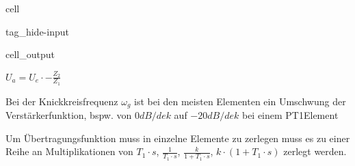 \documentclass[letterpaper,10pt,english]{jupyterBook}
\begin{document}
\begin{sphinxuseclass}{cell}
\begin{sphinxuseclass}{tag_hide-input}\begin{sphinxVerbatimOutput}

\begin{sphinxuseclass}{cell_output}
\noindent{}

\end{sphinxuseclass}\end{sphinxVerbatimOutput}

\end{sphinxuseclass}
\end{sphinxuseclass}
\sphinxAtStartPar
\(U_a = U_e\cdot -\frac{Z_2}{Z_1}\)

\begin{DUlineblock}{0em}
\item[] 
\end{DUlineblock}

\begin{DUlineblock}{0em}
\item[] 
\end{DUlineblock}

\begin{DUlineblock}{0em}
\item[] 
\end{DUlineblock}

\sphinxAtStartPar
Bei der Knickkreisfrequenz \(\omega_g\) ist bei den meisten Elementen ein Umschwung der Verstärkerfunktion, bspw. von \(0dB/dek\) auf \(-20dB/dek\) bei einem PT1\sphinxhyphen{}Element

\begin{DUlineblock}{0em}
\item[] 
\end{DUlineblock}

\sphinxAtStartPar
Um Übertragungsfunktion muss in einzelne Elemente zu zerlegen muss es zu einer Reihe an Multiplikationen von \(T_1\cdot s\), \(\frac{1}{T_1\cdot s}\), \(\frac{k}{1+T_1\cdot s}\), \(k\cdot(1 + T_1\cdot s)\) zerlegt werden.

\begin{DUlineblock}{0em}
\item[] 
\end{DUlineblock}
\end{document}
